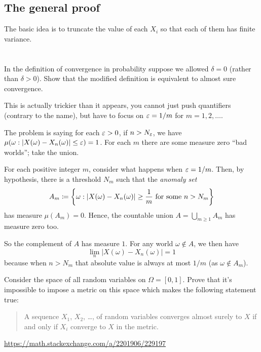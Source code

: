 \subsection{The general proof}

The basic idea is to truncate the value of each $X_i$ so that each of them has finite variance.


\section{\problemhead}
\begin{problem}
	\onechili
	In the definition of convergence in probability
	suppose we allowed $\delta = 0$
	(rather than $\delta > 0$).
	Show that the modified definition is
	equivalent to almost sure convergence.
	\begin{hint}
		This is actually trickier than it appears,
		you cannot just push quantifiers (contrary to the name),
		but have to focus on $\varepsilon = 1/m$ for $m = 1, 2, \dots$.

		The problem is saying for each $\varepsilon > 0$,
		if $n > N_\varepsilon$, we have
		$\mu(\omega : |X(\omega)-X_n(\omega)| \le \varepsilon) = 1$.
		For each $m$ there are some measure zero ``bad worlds'';
		take the union.
	\end{hint}
	\begin{sol}
		For each positive integer $m$,
		consider what happens when $\varepsilon = 1/m$.
		Then, by hypothesis, there is a threshold $N_m$
		such that the \emph{anomaly set}
		\[ A_m \coloneqq \left\{ \omega :
			|X(\omega)-X_n(\omega)| \ge \frac 1m
			\text{ for some } n > N_m \right\} \]
		has measure $\mu(A_m) = 0$.
		Hence, the countable union $A = \bigcup_{m \ge 1} A_m$ has measure zero too.

		So the complement of $A$ has measure $1$.
		For any world $\omega \notin A$,
		we then have
		\[ \lim_n \left\lvert X(\omega) - X_n(\omega) \right\rvert = 1 \]
		because when $n > N_m$ that absolute value
		is always at most $1/m$ (as $\omega \notin A_m$).
	\end{sol}
\end{problem}

\begin{problem}
	Consider the space of all random variables on $\Omega = [0,1]$.
	Prove that it's impossible to impose a metric on this space
	which makes the following statement true:
	\begin{quote}
		A sequence $X_1$, $X_2$, \dots, of random variables converges almost surely to $X$
		if and only if $X_i$ converge to $X$ in the metric.
	\end{quote}
	\begin{sol}
		\url{https://math.stackexchange.com/a/2201906/229197}
	\end{sol}
\end{problem}
